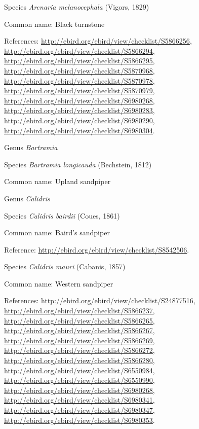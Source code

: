 \documentclass[9pt, article]{memoir}
\begin{document}
\begin{multicols}{2}
\vspace{6pt}\noindent\hspace{36pt}Species \textit{Arenaria melanocephala} (Vigors, 1829)


Common name: Black turnstone

References: 
\url{http://ebird.org/ebird/view/checklist/S5866256}, 
\url{http://ebird.org/ebird/view/checklist/S5866294}, 
\url{http://ebird.org/ebird/view/checklist/S5866295}, 
\url{http://ebird.org/ebird/view/checklist/S5870968}, 
\url{http://ebird.org/ebird/view/checklist/S5870978}, 
\url{http://ebird.org/ebird/view/checklist/S5870979}, 
\url{http://ebird.org/ebird/view/checklist/S6980268}, 
\url{http://ebird.org/ebird/view/checklist/S6980283}, 
\url{http://ebird.org/ebird/view/checklist/S6980290}, 
\url{http://ebird.org/ebird/view/checklist/S6980304}.

\vspace{6pt}\noindent\hspace{30pt}Genus \textit{Bartramia}


\vspace{6pt}\noindent\hspace{36pt}Species \textit{Bartramia longicauda} (Bechstein, 1812)


Common name: Upland sandpiper

\vspace{6pt}\noindent\hspace{30pt}Genus \textit{Calidris}


\vspace{6pt}\noindent\hspace{36pt}Species \textit{Calidris bairdii} (Coues, 1861)


Common name: Baird's sandpiper

Reference: 
\url{http://ebird.org/ebird/view/checklist/S8542506}.

\vspace{6pt}\noindent\hspace{36pt}Species \textit{Calidris mauri} (Cabanis, 1857)


Common name: Western sandpiper

References: 
\url{http://ebird.org/ebird/view/checklist/S24877516}, 
\url{http://ebird.org/ebird/view/checklist/S5866237}, 
\url{http://ebird.org/ebird/view/checklist/S5866265}, 
\url{http://ebird.org/ebird/view/checklist/S5866267}, 
\url{http://ebird.org/ebird/view/checklist/S5866269}, 
\url{http://ebird.org/ebird/view/checklist/S5866272}, 
\url{http://ebird.org/ebird/view/checklist/S5866280}, 
\url{http://ebird.org/ebird/view/checklist/S6550984}, 
\url{http://ebird.org/ebird/view/checklist/S6550990}, 
\url{http://ebird.org/ebird/view/checklist/S6980268}, 
\url{http://ebird.org/ebird/view/checklist/S6980341}, 
\url{http://ebird.org/ebird/view/checklist/S6980347}, 
\url{http://ebird.org/ebird/view/checklist/S6980353}.


\end{multicols}
\end{document}
